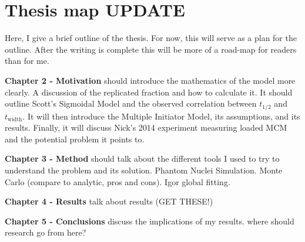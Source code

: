 		
	\section{Thesis map \textbf{UPDATE}}
	\label{sec:Map}

	Here, I give a brief outline of the thesis. For now, this will serve as a plan for the outline. After the writing is complete this will be more of a road-map for readers than for me.
	
	\textbf{Chapter 2 - Motivation}
	should introduce the mathematics of the model more clearly.
	A discussion of the replicated fraction and how to calculate it.
	It should outline Scott's Sigmoidal Model and the observed correlation between $t_{1/2}$ and $t_{\text{width}}$.
	It will then introduce the Multiple Initiator Model, its assumptions, and its results.
	Finally, it will discuss Nick's 2014 experiment measuring loaded MCM and the potential problem it points to.
	
	\textbf{Chapter 3 - Method}
	should talk about the different tools I used to try to understand the problem and its solution.
	Phantom Nuclei Simulation.
	Monte Carlo (compare to analytic, pros and cons).
	Igor global fitting.
	
	\textbf{Chapter 4 - Results}
	talk about results (GET THESE!)
	
	\textbf{Chapter 5 - Conclusions}
	discuss the implications of my results.
	where should research go from here?
		
		
		
		
		
		
		
		
		
		